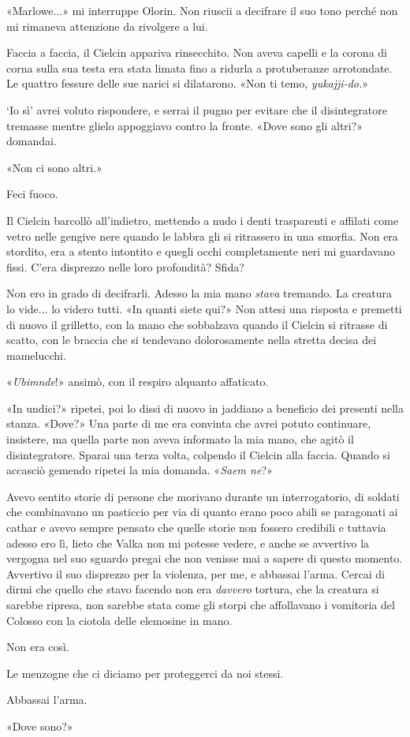 «Marlowe...» mi interruppe Olorin. Non riuscii a decifrare il suo tono
perché non mi rimaneva attenzione da rivolgere a lui.

Faccia a faccia, il Cielcin appariva rinsecchito. Non aveva capelli e la
corona di corna sulla sua testa era stata limata fino a ridurla a
protuberanze arrotondate. Le quattro fessure delle sue narici si
dilatarono. «Non ti temo, \emph{yukajji-do.}»

`Io sì' avrei voluto rispondere, e serrai il pugno per evitare che il
disintegratore tremasse mentre glielo appoggiavo contro la fronte. «Dove
sono gli altri?» domandai.

«Non ci sono altri.»

Feci fuoco.

Il Cielcin barcollò all'indietro, mettendo a nudo i denti trasparenti e
affilati come vetro nelle gengive nere quando le labbra gli si
ritrassero in una smorfia. Non era stordito, era a stento intontito e
quegli occhi completamente neri mi guardavano fissi. C'era disprezzo
nelle loro profondità? Sfida?

Non ero in grado di decifrarli. Adesso la mia mano \emph{stava}
tremando. La creatura lo vide... lo videro tutti. «In quanti siete qui?»
Non attesi una risposta e premetti di nuovo il grilletto, con la mano
che sobbalzava quando il Cielcin si ritrasse di scatto, con le braccia
che si tendevano dolorosamente nella stretta decisa dei mamelucchi.

«\emph{Ubimnde}!» ansimò, con il respiro alquanto affaticato.

«In undici?» ripetei, poi lo dissi di nuovo in jaddiano a beneficio dei
presenti nella stanza. «Dove?» Una parte di me era convinta che avrei
potuto continuare, insistere, ma quella parte non aveva informato la mia
mano, che agitò il disintegratore. Sparai una terza volta, colpendo il
Cielcin alla faccia. Quando si accasciò gemendo ripetei la mia domanda.
«\emph{Saem ne}?»

Avevo sentito storie di persone che morivano durante un interrogatorio,
di soldati che combinavano un pasticcio per via di quanto erano poco
abili se paragonati ai cathar e avevo sempre pensato che quelle storie
non fossero credibili e tuttavia adesso ero lì, lieto che Valka non mi
potesse vedere, e anche se avvertivo la vergogna nel suo sguardo pregai
che non venisse mai a sapere di questo momento. Avvertivo il suo
disprezzo per la violenza, per me, e abbassai l'arma. Cercai di dirmi
che quello che stavo facendo non era \emph{davvero} tortura, che la
creatura si sarebbe ripresa, non sarebbe stata come gli storpi che
affollavano i vomitoria del Colosso con la ciotola delle elemosine in
mano.

Non era così.

Le menzogne che ci diciamo per proteggerci da noi stessi.

Abbassai l'arma.

«Dove sono?»

